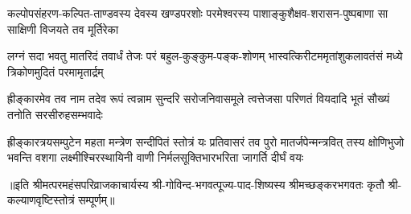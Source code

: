 \fourlineindentedshloka
{कल्पोपसंहरण-कल्पित-ताण्डवस्य}
{देवस्य खण्डपरशोः परमेश्वरस्य}
{पाशाङ्कुशैक्षव-शरासन-पुष्पबाणा}
{सा साक्षिणी विजयते तव मूर्तिरेका}%

\fourlineindentedshloka
{लग्नं सदा भवतु मातरिदं तवार्धं}
{तेजः परं बहुल-कुङ्कुम-पङ्क-शोणम्}
{भास्वत्किरीटममृतांशुकलावतंसं}
{मध्ये त्रिकोणमुदितं परमामृतार्द्रम्}%

\fourlineindentedshloka
{ह्रीङ्कारमेव तव नाम तदेव रूपं}
{त्वन्नाम सुन्दरि सरोजनिवासमूले}
{त्वत्तेजसा परिणतं वियदादि भूतं}
{सौख्यं तनोति सरसीरुहसम्भवादेः}%

\fourlineindentedshloka
{ह्रीङ्कारत्रयसम्पुटेन महता मन्त्रेण सन्दीपितं}
{स्तोत्रं यः प्रतिवासरं तव पुरो मातर्जपेन्मन्त्रवित्}
{तस्य क्षोणिभुजो भवन्ति वशगा लक्ष्मीश्चिरस्थायिनी}
{वाणी निर्मलसूक्तिभारभरिता जागर्ति दीर्घं वयः}%

॥इति श्रीमत्परमहंसपरिव्राजकाचार्यस्य श्री-गोविन्द-भगवत्पूज्य-पाद-शिष्यस्य
श्रीमच्छङ्करभगवतः कृतौ श्री-कल्याणवृष्टिस्तोत्रं  सम्पूर्णम्॥